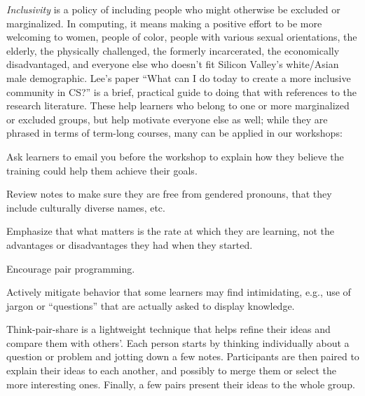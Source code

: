 \emph{Inclusivity} is a policy of including people who might otherwise
be excluded or marginalized. In computing, it means making a positive
effort to be more welcoming to women, people of color, people with
various sexual orientations, the elderly, the physically challenged,
the formerly incarcerated, the economically disadvantaged, and
everyone else who doesn't fit Silicon Valley's white/Asian male
demographic. Lee's paper ``What can I do today to create a more
inclusive community in CS?'' \cite{bib:lee-create-inclusive-community}
is a brief, practical guide to doing that with references to the
research literature. These help learners who belong to one or more
marginalized or excluded groups, but help motivate everyone else as
well; while they are phrased in terms of term-long courses, many can
be applied in our workshops:

\begin{gitemize}

\item
  Ask learners to email you before the workshop to explain how they
  believe the training could help them achieve their goals.

\item
  Review notes to make sure they are free from gendered pronouns, that
  they include culturally diverse names, etc.

\item
  Emphasize that what matters is the rate at which they are learning,
  not the advantages or disadvantages they had when they started.

\item
  Encourage pair programming.

\item
  Actively mitigate behavior that some learners may find intimidating,
  e.g., use of jargon or ``questions'' that are actually asked to
  display knowledge.

\end{gitemize}



Think-pair-share is a lightweight technique that helps refine their
ideas and compare them with others'.  Each person starts by thinking
individually about a question or problem and jotting down a few notes.
Participants are then paired to explain their ideas to each another,
and possibly to merge them or select the more interesting ones.
Finally, a few pairs present their ideas to the whole group.

